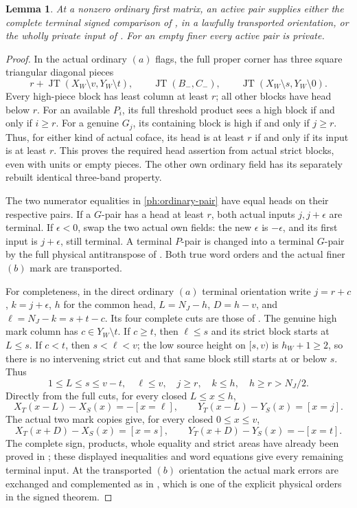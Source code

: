 \documentclass[11pt,a4paper]{amsart}
\numberwithin{equation}{section}
\theoremstyle{plain}
\newtheorem{lemma}[theorem]{Lemma}
\theoremstyle{definition}
\newcommand{\JT}{\operatorname{JT}}
\begin{document}
\begin{lemma}\label{ph:active-dichotomy}
At a nonzero ordinary first matrix, an active pair supplies either the
complete terminal signed comparison of , in a
lawfully transported orientation, or the wholly private input of
.
For an empty finer every active pair is private.
\end{lemma}
\begin{proof}
In the actual ordinary \((a)\) flags, the full proper corner has three
square triangular diagonal pieces
\[
 r+\JT(X_W\setminus v,Y_W\setminus t),\qquad
 \JT(B_-,C_-),\qquad
 \JT(X_W\setminus s,Y_W\setminus0).
\]
Every high-piece block has least column at least \(r\); all other
blocks have head below \(r\).
For an available \(P_i\), its full threshold product sees a high block
if and only if \(i\ge r\).  For a genuine \(G_j\), its containing block
is high if and only if \(j\ge r\).
Thus, for either kind of actual coface, its head is at least \(r\)
if and only if its input is at least \(r\).
This proves the required head assertion from actual strict blocks,
even with units or empty pieces.  The other own ordinary field has
its separately rebuilt identical three-band property.

The two numerator equalities in \eqref{ph:ordinary-pair} have equal
heads on their respective pairs.  If a \(G\)-pair has a head at least
\(r\), both actual inputs \(j,j+\epsilon\) are terminal.
If \(\epsilon<0\), swap the two actual own fields: the new
\(\epsilon\) is \(-\epsilon\), and its first input is \(j+\epsilon\),
still terminal.  A terminal \(P\)-pair is changed into a terminal
\(G\)-pair by the full physical antitranspose of .
Both true word orders and the actual finer \((b)\) mark are transported.

For completeness, in the direct ordinary \((a)\) terminal orientation
write \(j=r+c\), \(k=j+\epsilon\), \(h\) for the common head,
\(L=N_J-h\), \(D=h-v\), and
\(\ell=N_J-k=s+t-c\).
Its four complete cuts are those of .
The genuine high mark column has \(c\in Y_W\setminus t\).
If \(c\ge t\), then \(\ell\le s\) and its strict block starts at
\(L\le s\).  If \(c<t\), then \(s<\ell<v\); the low source height
on \([s,v)\) is \(h_W+1\ge2\), so there is no intervening strict cut
and that same block still starts at or below \(s\).
Thus
\[
 1\le L\le s\le v-t,\quad \ell\le v,\quad
 j\ge r,\quad k\le h,\quad h\ge r>N_J/2.
\]
Directly from the full cuts, for every closed \(L\le x\le h\),
\[
 X_T(x-L)-X_S(x)=-[x=\ell],\qquad
 Y_T(x-L)-Y_S(x)=[x=j].
\]
The actual two mark copies give, for every closed \(0\le x\le v\),
\[
 X_T(x+D)-X_S(x)=[x=s],\qquad
 Y_T(x+D)-Y_S(x)=-[x=t].
\]
The complete sign, products, whole equality and strict areas have
already been proved in ; these displayed
inequalities and word equations give every remaining terminal input.
At the transported \((b)\) orientation the actual mark errors are
exchanged and complemented as in , which is one
of the explicit physical orders in the signed theorem.


\end{proof}
\end{document}
